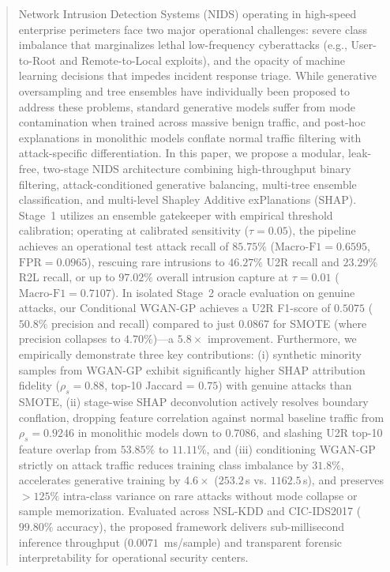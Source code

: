 \documentclass[journal]{IEEEtran}
\begin{document}
\begin{abstract}
Network Intrusion Detection Systems (NIDS) operating in high-speed enterprise perimeters face two major operational challenges: severe class imbalance that marginalizes lethal low-frequency cyberattacks (e.g., User-to-Root and Remote-to-Local exploits), and the opacity of machine learning decisions that impedes incident response triage. While generative oversampling and tree ensembles have individually been proposed to address these problems, standard generative models suffer from mode contamination when trained across massive benign traffic, and post-hoc explanations in monolithic models conflate normal traffic filtering with attack-specific differentiation. In this paper, we propose a modular, leak-free, two-stage NIDS architecture combining high-throughput binary filtering, attack-conditioned generative balancing, multi-tree ensemble classification, and multi-level Shapley Additive exPlanations (SHAP). Stage~1 utilizes an ensemble gatekeeper with empirical threshold calibration; operating at calibrated sensitivity ($\tau = 0.05$), the pipeline achieves an operational test attack recall of $85.75\%$ ($\text{Macro-F1} = 0.6595$, $\text{FPR} = 0.0965$), rescuing rare intrusions to $46.27\%$ U2R recall and $23.29\%$ R2L recall, or up to $97.02\%$ overall intrusion capture at $\tau = 0.01$ ($\text{Macro-F1} = 0.7107$). In isolated Stage~2 oracle evaluation on genuine attacks, our Conditional WGAN-GP achieves a U2R F1-score of $0.5075$ ($50.8\%$ precision and recall) compared to just $0.0867$ for SMOTE (where precision collapses to $4.70\%$)---a $5.8\times$ improvement. Furthermore, we empirically demonstrate three key contributions: (i) synthetic minority samples from WGAN-GP exhibit significantly higher SHAP attribution fidelity ($\rho_s = 0.88$, top-10 Jaccard = $0.75$) with genuine attacks than SMOTE, (ii) stage-wise SHAP deconvolution actively resolves boundary conflation, dropping feature correlation against normal baseline traffic from $\rho_s = 0.9246$ in monolithic models down to $0.7086$, and slashing U2R top-10 feature overlap from $53.85\%$ to $11.11\%$, and (iii) conditioning WGAN-GP strictly on attack traffic reduces training class imbalance by $31.8\%$, accelerates generative training by $4.6\times$ ($253.2$\,s vs. $1162.5$\,s), and preserves $>125\%$ intra-class variance on rare attacks without mode collapse or sample memorization. Evaluated across NSL-KDD and CIC-IDS2017 ($99.80\%$ accuracy), the proposed framework delivers sub-millisecond inference throughput ($0.0071$~ms/sample) and transparent forensic interpretability for operational security centers.
\end{abstract}
\end{document}
